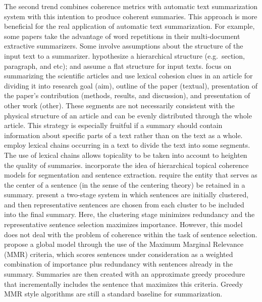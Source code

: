 The second trend combines coherence metrics with automatic text summarization system with this intention to produce coherent summaries.  
This approach is more beneficial for the real application of automatic text summarization. 
For example, some papers \cite{radev04a,nenkova05} take the advantage of word repetitions in their multi-document extractive summarizers. 
Some involve assumptions about the structure of the input text to a summarizer. 
 hypothesize a hierarchical structure (e.g.\ section, paragraph, and etc); and  assume a flat structure for input texts. 
 focus on summarizing the scientific articles and use lexical cohesion clues in an article for dividing it into research goal (aim), outline of the paper (textual), presentation of the paper's contribution (methods, results, and discussion), and presentation of other work (other). 
These segments are not necessarily consistent with the physical structure of an article and can be evenly distributed through the whole article. 
This strategy is especially fruitful if a summary should contain information about specific parts of a text rather than on the text as a whole.  
 employ lexical chains occurring in a text to divide the text into some segments.  
The use of lexical chains allows topicality to be taken into account to heighten the quality of summaries.
 incorporate the idea of hierarchical topical coherence models for segmentation and sentence extraction. 
 require the entity that serves as the center of a sentence (in the sense of the centering theory) be retained in a summary. 
 present a \mbox{two-stage} system in which sentences are initially clustered, and then representative sentences are chosen from each cluster to be included into the final summary. 
Here, the clustering stage minimizes redundancy and the representative sentence selection maximizes importance.
However, this model does not deal with the problem of coherence within the task of sentence selection. 
 propose a global model through the use of the Maximum Marginal Relevance (MMR) criteria, which scores sentences under consideration as a weighted combination of importance plus redundancy with sentences already in the summary. 
Summaries are then created with an approximate greedy procedure that incrementally includes the sentence that maximizes this criteria. Greedy MMR style algorithms are still a standard baseline for summarization. 

